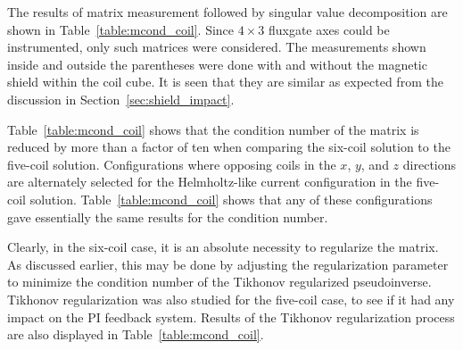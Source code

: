 The results of matrix measurement followed by singular value
decomposition are shown in Table~\ref{table:mcond_coil}.  Since $4\times 3$ fluxgate axes could be instrumented, only such matrices
were considered.  The measurements shown inside and outside the parentheses were done with and without the magnetic shield within the coil cube. It is seen that they are similar as expected from the discussion in Section~\ref{sec:shield_impact}.

Table~\ref{table:mcond_coil} shows that the condition number of the
matrix is reduced by more than a factor of ten when comparing the
six-coil solution to the five-coil solution.  Configurations where
opposing coils in the $x$, $y$, and $z$ directions are alternately
selected for the Helmholtz-like current configuration in the five-coil
solution.  Table~\ref{table:mcond_coil} shows that any of these
configurations gave essentially the same results for the condition
number.

Clearly, in the six-coil case, it is an absolute necessity to
regularize the matrix.  As discussed earlier, this may be done by
adjusting the regularization parameter to minimize the condition
number of the Tikhonov regularized pseudoinverse. Tikhonov regularization was also studied for the five-coil case, to see if it had
any impact on the PI feedback system.  Results of the Tikhonov
regularization process are also displayed in
Table~\ref{table:mcond_coil}.



